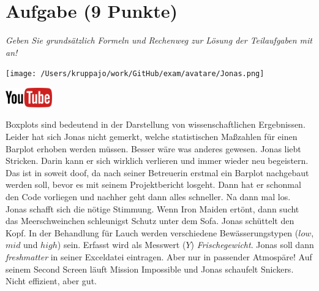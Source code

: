 \documentclass[a4paper, 9pt]{scrartcl}\usepackage[]{graphicx}\usepackage[]{xcolor}
\begin{document}
\section{Aufgabe \hfill (9 Punkte)}

\textit{Geben Sie grundsätzlich Formeln und Rechenweg zur Lösung der Teilaufgaben mit an!} \\[1Ex]
 

 
\begin{minipage}[t]{0.5\textwidth}
\texttt{[image: /Users/kruppajo/work/GitHub/exam/avatare/Jonas.png]}
\end{minipage}
\begin{minipage}[t]{0.5\textwidth}
\hfill
\href{https://youtu.be/Xf0yE-o7bEU}{\includegraphics[width = 2cm]{img/youtube}}\\[1Ex]
\end{minipage}
\vspace{1ex}



Boxplots sind bedeutend in der Darstellung von wissenschaftlichen Ergebnissen. Leider hat sich Jonas nicht gemerkt, welche statistischen Maßzahlen für einen Barplot erhoben werden müssen. Besser wäre was anderes gewesen. Jonas liebt Stricken. Darin kann er sich wirklich verlieren und immer wieder neu begeistern. Das ist in soweit doof, da nach seiner Betreuerin erstmal ein Barplot nachgebaut werden soll, bevor es mit seinem Projektbericht losgeht. Dann hat er schonmal den \Rlogo Code vorliegen und nachher geht dann alles schneller. Na dann mal los. Jonas schafft sich die nötige Stimmung. Wenn Iron Maiden ertönt, dann sucht das Meerschweinchen schleunigst Schutz unter dem Sofa. Jonas schüttelt den Kopf. In der Behandlung für Lauch werden verschiedene Bewässerungstypen ($low$, $mid$ und $high$) sein. Erfasst wird als Messwert ($Y$) \textit{Frischegewicht}. Jonas soll dann \textit{freshmatter} in seiner Exceldatei eintragen. Aber nur in passender Atmospäre! Auf seinem Second Screen läuft Mission Impossible und Jonas schaufelt Snickers. Nicht effizient, aber gut.
\end{document}
